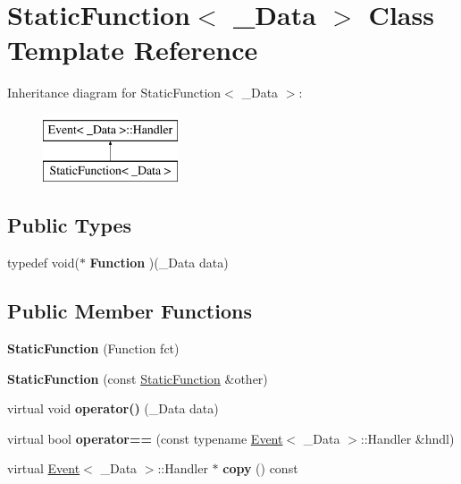\hypertarget{class_static_function}{
\section{StaticFunction$<$ \_\-Data $>$ Class Template Reference}
\label{class_static_function}
}
Inheritance diagram for StaticFunction$<$ \_\-Data $>$:\begin{figure}[H]
\begin{center}
\leavevmode
\includegraphics[height=2cm]{class_static_function}
\end{center}
\end{figure}
\subsection*{Public Types}
\begin{DoxyCompactItemize}
\item 
\hypertarget{class_static_function_ac4b33bd17de8b3391cac6a67384b6deb}{
typedef void($\ast$ {\bfseries Function} )(\_\-Data data)}
\label{class_static_function_ac4b33bd17de8b3391cac6a67384b6deb}

\end{DoxyCompactItemize}
\subsection*{Public Member Functions}
\begin{DoxyCompactItemize}
\item 
\hypertarget{class_static_function_ae41ccbed3264228fd2b4526118930def}{
{\bfseries StaticFunction} (Function fct)}
\label{class_static_function_ae41ccbed3264228fd2b4526118930def}

\item 
\hypertarget{class_static_function_ab2a064fe4f0f67661ce54d89d48bc394}{
{\bfseries StaticFunction} (const \hyperlink{class_static_function}{StaticFunction} \&other)}
\label{class_static_function_ab2a064fe4f0f67661ce54d89d48bc394}

\item 
\hypertarget{class_static_function_a316fa3b3f24aaf7c332b9c83478a8cd7}{
virtual void {\bfseries operator()} (\_\-Data data)}
\label{class_static_function_a316fa3b3f24aaf7c332b9c83478a8cd7}

\item 
\hypertarget{class_static_function_abeb87bce081f2766bc2e5f9d7343ee62}{
virtual bool {\bfseries operator==} (const typename \hyperlink{class_event}{Event}$<$ \_\-Data $>$::Handler \&hndl)}
\label{class_static_function_abeb87bce081f2766bc2e5f9d7343ee62}

\item 
\hypertarget{class_static_function_a4e082597ea8bc4ae3b298df90f45bded}{
virtual \hyperlink{class_event}{Event}$<$ \_\-Data $>$::Handler $\ast$ {\bfseries copy} () const }
\label{class_static_function_a4e082597ea8bc4ae3b298df90f45bded}

\end{DoxyCompactItemize}
